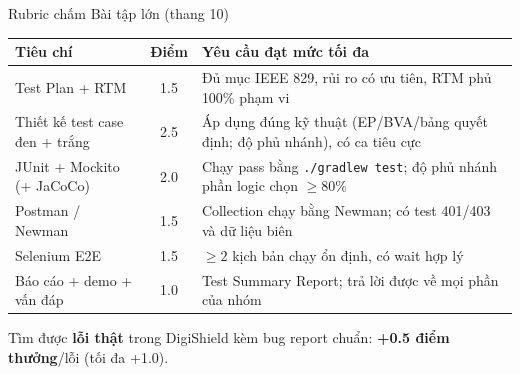 \documentclass[aspectratio=169,12pt]{beamer}
\begin{document}
\begin{frame}{Rubric chấm Bài tập lớn (thang 10)}
  \begin{center}
  \scriptsize
  \setlength{\tabcolsep}{4pt}
  \begin{tabular}{>{\raggedright\arraybackslash}p{4.4cm}c>{\raggedright\arraybackslash}p{6.2cm}}
    \toprule
    \textbf{Tiêu chí} & \textbf{Điểm} & \textbf{Yêu cầu đạt mức tối đa} \\
    \midrule
    Test Plan + RTM & 1.5 & Đủ mục IEEE 829, rủi ro có ưu tiên, RTM phủ 100\% phạm vi \\
    Thiết kế test case đen + trắng & 2.5 & Áp dụng đúng kỹ thuật (EP/BVA/bảng quyết định; độ phủ nhánh), có ca tiêu cực \\
    JUnit + Mockito (+ JaCoCo) & 2.0 & Chạy pass bằng \texttt{./gradlew test}; độ phủ nhánh phần logic chọn $\ge 80\%$ \\
    Postman / Newman & 1.5 & Collection chạy bằng Newman; có test 401/403 và dữ liệu biên \\
    Selenium E2E & 1.5 & $\ge 2$ kịch bản chạy ổn định, có wait hợp lý \\
    Báo cáo + demo + vấn đáp & 1.0 & Test Summary Report; trả lời được về mọi phần của nhóm \\
    \bottomrule
  \end{tabular}
  \end{center}

  \vspace{0.25em}
  \small Tìm được \textbf{lỗi thật} trong DigiShield kèm bug report chuẩn:
  \textbf{+0.5 điểm thưởng}/lỗi (tối đa +1.0).
\end{frame}
\end{document}
